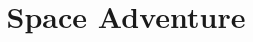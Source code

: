 \documentclass{beamer}
\title{Space Adventure}
\begin{document}
\begin{frame}
	\maketitle
\end{frame}
\end{document}
